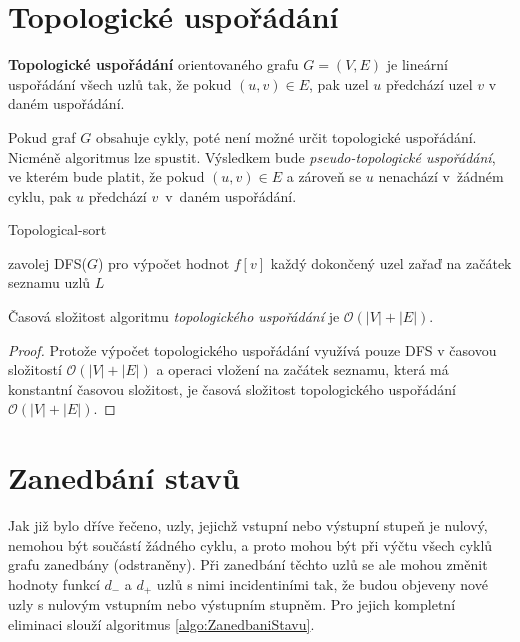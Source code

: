     \section{Topologické uspořádání}
        \begin{definition}
            \textbf{Topologické uspořádání} orientovaného grafu $G = (V, E)$ je lineární uspořádání všech uzlů tak, že pokud $(u, v) \in E$, pak uzel $u$ předchází uzel $v$ v daném uspořádání.
        \end{definition}

        \vspace*{1em}
        Pokud graf $G$ obsahuje cykly, poté není možné určit topologické uspořádání. Nicméně algoritmus lze spustit. Výsledkem bude \textit{pseudo-topologické uspořádání}, ve kterém bude platit, že pokud $(u, v) \in E$ a zároveň se $u$ nenachází v~žádném cyklu, pak $u$ předchází $v$~v~daném uspořádání.

        \begin{algorithm}
            \DontPrintSemicolon
            \caption{Topological-sort}
            \vspace*{0.5em}

            zavolej DFS($G$) pro výpočet hodnot $f[v]$\;
            každý dokončený uzel zařaď na začátek seznamu uzlů $L$\;
            \vspace*{0.5em}

        \end{algorithm}

        \begin{theorem}
            Časová složitost algoritmu \textit{topologického uspořádání} je $\mathcal{O}(|V| + |E|)$.
        \end{theorem}
        \begin{proof}
            Protože výpočet topologického uspořádání využívá pouze DFS v časovou složitostí $\mathcal{O}(|V| + |E|)$ a operaci vložení na začátek seznamu, která má konstantní časovou složitost, je časová složitost topologického uspořádání $\mathcal{O}(|V| + |E|)$.
        \end{proof}

    \section{Zanedbání stavů}

        Jak již bylo dříve řečeno, uzly, jejichž vstupní nebo výstupní stupeň je nulový, nemohou být součástí žádného cyklu, a proto mohou být při výčtu všech cyklů grafu zanedbány (odstraněny). Při zanedbání těchto uzlů se ale mohou změnit hodnoty funkcí $d_-$ a $d_+$ uzlů s nimi incidentiními tak, že budou objeveny nové uzly s nulovým vstupním nebo výstupním stupněm. Pro jejich kompletní eliminaci slouží algoritmus \ref{algo:ZanedbaniStavu}.

